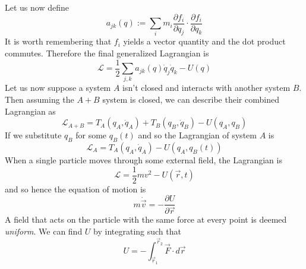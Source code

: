 \documentclass{article}
\newcommand{\pd}[2]{\frac{\partial #1}{\partial #2}}
\newcommand{\lagr}{\mathscr{L}}
\theoremstyle{definition}
\theoremstyle{remark}
\begin{document}
Let us now define 
\begin{equation*}
    a_{jk}(q) := \sum_i m_i \pd{f_i}{q_j}\cdot \pd{f_i}{q_k}
\end{equation*}
It is worth remembering that $f_i$ yields a vector quantity and the dot product commutes. Therefore the final generalized Lagrangian is 
\begin{equation}
    \lagr = \frac{1}{2}\sum_{j,k}a_{jk}(q) \dot q_j \dot q_k -U(q)
\end{equation} 
Let us now suppose a system $A$ isn't closed and interacts with another system $B$. Then assuming the $A+B$ system is closed, we can describe their combined Lagrangian as 
\begin{equation*}
    \lagr_{A+B} = T_A(q_A,\dot q_A) + T_B(q_B,\dot q_B) -U(q_A,q_B)
\end{equation*}
If we substitute $q_B$ for some $q_B(t)$ and so the Lagrangian of system $A$ is 
\begin{equation}
    \lagr_A =T_A(q_A,\dot q_A) - U(q_A,q_B(t))
\end{equation}
When a single particle moves through some external field, the Lagrangian is 
\begin{equation*}
    \lagr = \frac{1}{2}mv^2-U(\vec r,t) 
\end{equation*}
and so hence the equation of motion is 
\begin{equation*}
    m\dot{\vec{v}} =-\pd{U}{\vec r}
\end{equation*}
A field that acts on the particle with the same force at every point is deemed \emph{uniform}. We can find $U$ by integrating such that 
\begin{equation*}
    U = -\int^{\vec{r}_2}_{\vec r_1} \vec F \cdot d\vec r
\end{equation*}
\end{document}
